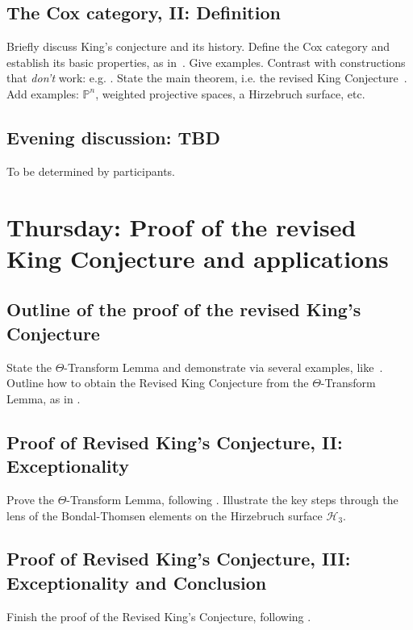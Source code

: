 \documentclass[11pt]{amsart}
\numberwithin{equation}{section}
\theoremstyle{definition}
\theoremstyle{remark}
\newcommand{\PP}{\mathbb P}
\begin{document}
\subsection{The Cox category, II: Definition}
Briefly discuss King's conjecture and its history.
Define the Cox category and establish its basic properties, as in~\cite[\S3]{BBB+24}.  Give examples.  Contrast with constructions that \emph{don't} work: e.g. \cite[Remark 4.8]{BBB+24}.  State the main theorem, i.e. the revised King Conjecture~\cite[Theorem A]{BBB+24}.    Add examples: $\PP^n$, weighted projective spaces, a Hirzebruch surface, etc.
    

\subsection*{Evening discussion: TBD}  To be determined by participants.

\section{Thursday: Proof of the revised King Conjecture and applications}
\subsection{Outline of the proof of the revised King's Conjecture}
State the $\Theta$-Transform Lemma and demonstrate via several examples, like~\cite[\S4.2]{BBB+24}.  Outline how to obtain the Revised King Conjecture from the $\Theta$-Transform Lemma, as in \cite[\S1.2]{BBB+24}.

\subsection{Proof of Revised King's Conjecture, II: Exceptionality}
Prove the $\Theta$-Transform Lemma, following \cite[\S4.3]{BBB+24}.  Illustrate the key steps through the lens of the Bondal-Thomsen elements on the Hirzebruch surface $\mathcal H_3$.

\subsection{Proof of Revised King's Conjecture, III: Exceptionality and Conclusion}
Finish the proof of the Revised King's Conjecture, following \cite[\S4.3 and \S5]{BBB+24}.
\end{document}
